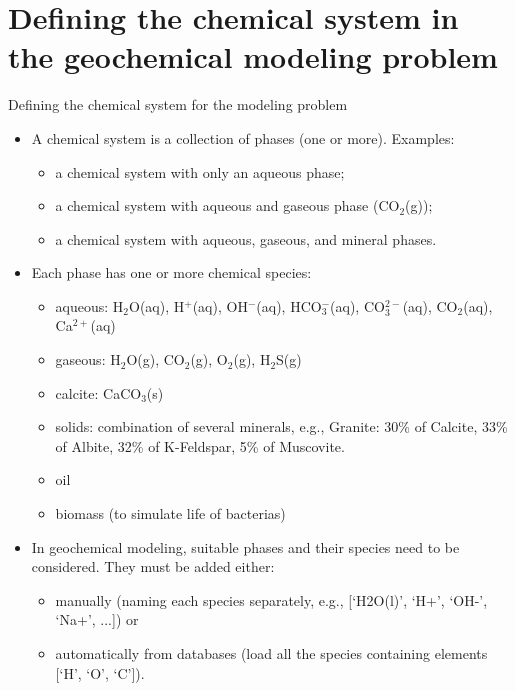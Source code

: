 %
\section{Defining the chemical system in the geochemical modeling problem}
%
\begin{frame}[<+->]{Defining the chemical system for the modeling problem}
\begin{itemize}
\item A chemical system is a collection of phases (one or more). Examples:
\begin{itemize}
\item a chemical system with only an aqueous phase;
\item a chemical system with aqueous and gaseous phase (CO$_2$(g));
\item a chemical system with aqueous, gaseous, and mineral phases.
\end{itemize}
\item Each phase has one or more chemical species:
\begin{itemize}
\item aqueous: H$_{2}$O(aq), H$^{+}$(aq), OH$^{-}$(aq), HCO$_{3}^{-}$(aq),
CO$_{3}^{2-}$(aq), CO$_{2}$(aq), Ca$^{2+}$(aq)
\item gaseous: H$_{2}$O(g), CO$_{2}$(g), O$_{2}$(g), H$_{2}$S(g)
\item calcite: CaCO$_{3}$(s)
\item solids: combination of several minerals, e.g., Granite: 30\% of Calcite, 33\% of Albite, 32\% of K-Feldspar, 5\% of Muscovite. 
\item oil
\item biomass (to simulate life of bacterias)
\end{itemize}
\item In geochemical modeling, suitable phases and their species need to
be considered. They must be added either: 
\begin{itemize}
\item manually (naming each species separately, e.g., [`H2O(l)', `H+', `OH-', `Na+', ...]) or 
\item automatically from databases (load all the species containing elements [`H', `O', `C']).
\end{itemize}
\end{itemize}
\end{frame}
